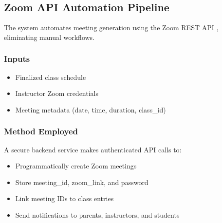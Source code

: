 


\subsection{Zoom API Automation Pipeline}

The system automates meeting generation using the Zoom REST API \cite{ZoomAPI2025}, eliminating manual workflows.

\subsubsection*{Inputs}
\begin{itemize}
    \item Finalized class schedule
    \item Instructor Zoom credentials
    \item Meeting metadata (date, time, duration, class\_id)
\end{itemize}

\subsubsection*{Method Employed}
A secure backend service makes authenticated API calls to:
\begin{itemize}
    \item Programmatically create Zoom meetings
    \item Store meeting\_id, zoom\_link, and password
    \item Link meeting IDs to class entries
    \item Send notifications to parents, instructors, and students
\end{itemize}

